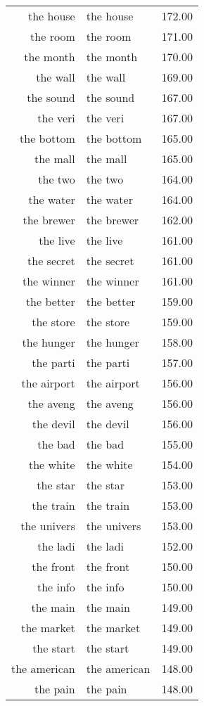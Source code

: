 \begin{table}[ht]
\begin{tabular}{rlr}
  the house & the house & 172.00 \\ 
  the room & the room & 171.00 \\ 
  the month & the month & 170.00 \\ 
  the wall & the wall & 169.00 \\ 
  the sound & the sound & 167.00 \\ 
  the veri & the veri & 167.00 \\ 
  the bottom & the bottom & 165.00 \\ 
  the mall & the mall & 165.00 \\ 
  the two & the two & 164.00 \\ 
  the water & the water & 164.00 \\ 
  the brewer & the brewer & 162.00 \\ 
  the live & the live & 161.00 \\ 
  the secret & the secret & 161.00 \\ 
  the winner & the winner & 161.00 \\ 
  the better & the better & 159.00 \\ 
  the store & the store & 159.00 \\ 
  the hunger & the hunger & 158.00 \\ 
  the parti & the parti & 157.00 \\ 
  the airport & the airport & 156.00 \\ 
  the aveng & the aveng & 156.00 \\ 
  the devil & the devil & 156.00 \\ 
  the bad & the bad & 155.00 \\ 
  the white & the white & 154.00 \\ 
  the star & the star & 153.00 \\ 
  the train & the train & 153.00 \\ 
  the univers & the univers & 153.00 \\ 
  the ladi & the ladi & 152.00 \\ 
  the front & the front & 150.00 \\ 
  the info & the info & 150.00 \\ 
  the main & the main & 149.00 \\ 
  the market & the market & 149.00 \\ 
  the start & the start & 149.00 \\ 
  the american & the american & 148.00 \\ 
  the pain & the pain & 148.00 \\ 

\end{tabular}
\end{table}
